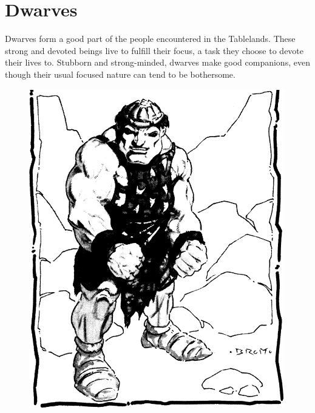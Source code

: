 \section{Dwarves}

Dwarves form a good part of the people encountered in the Tablelands. These strong and devoted beings live to fulfill their focus, a task they choose to devote their lives to. Stubborn and strong-minded, dwarves make good companions, even though their usual focused nature can tend to be bothersome.

\begin{figure}[t!]
\centering
\includegraphics[width=\columnwidth]{images/dwarf-1.png}
\WOTC
\end{figure}

